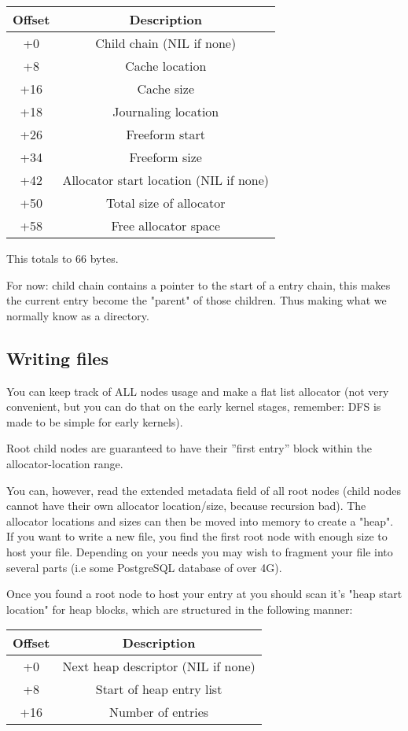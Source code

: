 \documentclass[12pt]{article}
\begin{document}
\begin{center}
\begin{tabular}{ |c|c| }
\hline
Offset & Description \\
\hline
+0 & Child chain (NIL if none) \\
+8 & Cache location \\
+16 & Cache size \\
+18 & Journaling location \\
+26 & Freeform start \\
+34 & Freeform size \\
+42 & Allocator start location (NIL if none) \\
+50 & Total size of allocator \\
+58 & Free allocator space \\
\hline
\end{tabular}
\end{center}

This totals to 66 bytes.

For now: child chain contains a pointer to the start of a entry chain, this makes the current entry become the "parent" of those children. Thus making what we normally know as a directory.

\subsection{Writing files}
You can keep track of ALL nodes usage and make a flat list allocator (not very convenient, but you can do that on the early kernel stages, remember: DFS is made to be simple for early kernels).

Root child nodes are guaranteed to have their ''first entry'' block within the allocator-location range.

You can, however, read the extended metadata field of all root nodes (child nodes cannot have their own allocator location/size, because recursion bad). The allocator locations and sizes can then be moved into memory to create a "heap". If you want to write a new file, you find the first root node with enough size to host your file. Depending on your needs you may wish to fragment your file into several parts (i.e some PostgreSQL database of over 4G).

Once you found a root node to host your entry at you should scan it's "heap start location" for heap blocks, which are structured in the following manner:
\begin{center}
\begin{tabular}{ |c|c| }
\hline
Offset & Description \\
\hline
+0 & Next heap descriptor (NIL if none) \\
+8 & Start of heap entry list \\
+16 & Number of entries \\
\hline
\end{tabular}
\end{center}
\end{document}
